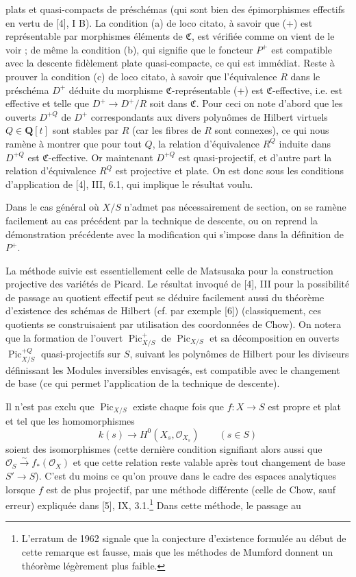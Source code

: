 plats et quasi-compacts de préschémas (qui sont bien des épimorphismes
effectifs en vertu de [4], I B). La condition (a) de loco citato, à savoir que
(+) est représentable par morphismes éléments de $\mathfrak C$, est vérifiée
comme on vient de le voir ; de même la condition (b), qui signifie que le
foncteur $P^+$ est compatible avec la descente fidèlement plate
quasi-compacte, ce qui est immédiat. Reste à prouver la condition (c) de loco
citato, à savoir que l'équivalence $R$ dans le préschéma $D^+$ déduite du
morphisme $\mathfrak C$-représentable (+) est $\mathfrak C$-effective, i.e. est
effective et telle que $D^+\longrightarrow D^+/R$ soit dans $\mathfrak C$.
Pour ceci on note d'abord que les ouverts $D^{+Q}$ de $D^+$ correspondants aux
divers polynômes de Hilbert virtuels $Q\in\mathbf Q[t]$ sont stables par $R$
(car les fibres de $R$ sont connexes), ce qui nous ramène à montrer que pour
tout $Q$, la relation d'équivalence $R^Q$ induite dans $D^{+Q}$ est
$\mathfrak C$-effective. Or maintenant $D^{+Q}$ est quasi-projectif, et d'autre
part la relation d'équivalence $R^Q$ est projective et plate. On est donc sous
les conditions d'application de [4], III, 6.1, qui implique le résultat voulu.

Dans le cas général où $X/S$ n'admet pas nécessairement de section, on se
ramène facilement au cas précédent par la technique de descente, ou on reprend
la démonstration précédente avec la modification qui s'impose dans la
définition de $P^+$.

 La méthode suivie est essentiellement celle de Matsusaka
pour la construction projective des variétés de Picard. Le résultat invoqué de
[4], III pour la possibilité de passage au quotient effectif peut se déduire
facilement aussi du théorème d'existence des schémas de Hilbert (cf. par
exemple [6]) (classiquement, ces quotients se construisaient par utilisation
des coordonnées de Chow). On notera que la formation de l'ouvert
$\operatorname{Pic}^{+}_{X/S}$ de $\operatorname{Pic}_{X/S}$ et sa
décomposition en ouverts $\operatorname{Pic}^{+Q}_{X/S}$ quasi-projectifs sur
$S$, suivant les polynômes de Hilbert pour les diviseurs définissant les
Modules inversibles envisagés, est compatible avec le changement de base (ce
qui permet l'application de la technique de descente).

 Il n'est pas exclu que $\operatorname{Pic}_{X/S}$ existe
chaque fois que $f:X\longrightarrow S$ est propre et plat et tel que les
homomorphismes
\[
k(s)\longrightarrow H^0(X_s,\mathcal O_{X_s})\qquad(s\in S)
\]
soient des isomorphismes (cette dernière condition signifiant alors aussi que
$\mathcal O_S\xrightarrow{\sim}f_*(\mathcal O_X)$ et que cette relation reste
valable après tout changement de base $S'\longrightarrow S$). C'est du moins
ce qu'on prouve dans le cadre des espaces analytiques lorsque $f$ est de plus
projectif, par une méthode différente (celle de Chow, sauf erreur) expliquée
dans [5], IX, 3.1.\footnote{L'erratum de 1962 signale que la conjecture
d'existence formulée au début de cette remarque est fausse, mais que les
méthodes de Mumford donnent un théorème légèrement plus faible.} Dans cette
méthode, le passage au

